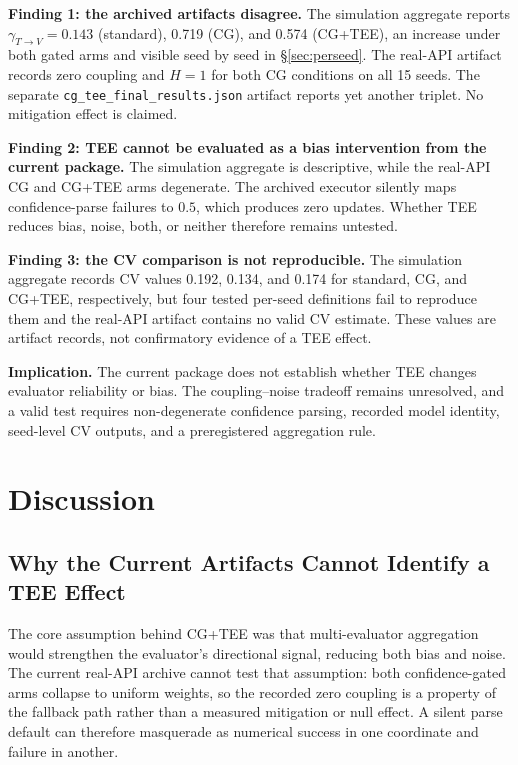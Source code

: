 \documentclass[11pt]{article}
\begin{document}
\textbf{Finding 1: the archived artifacts disagree.} The simulation aggregate reports $\gamma_{T\to V}=0.143$ (standard), 0.719 (CG), and 0.574 (CG+TEE), an increase under both gated arms and visible seed by seed in \S\ref{sec:perseed}. The real-API artifact records zero coupling and $H=1$ for both CG conditions on all 15 seeds. The separate \texttt{cg\_tee\_final\_results.json} artifact reports yet another triplet. No mitigation effect is claimed.

\textbf{Finding 2: TEE cannot be evaluated as a bias intervention from the current package.} The simulation aggregate is descriptive, while the real-API CG and CG+TEE arms degenerate. The archived executor silently maps confidence-parse failures to $0.5$, which produces zero updates. Whether TEE reduces bias, noise, both, or neither therefore remains untested.

\textbf{Finding 3: the CV comparison is not reproducible.} The simulation aggregate records CV values 0.192, 0.134, and 0.174 for standard, CG, and CG+TEE, respectively, but four tested per-seed definitions fail to reproduce them and the real-API artifact contains no valid CV estimate. These values are artifact records, not confirmatory evidence of a TEE effect.

\textbf{Implication.} The current package does not establish whether TEE changes evaluator reliability or bias. The coupling--noise tradeoff remains unresolved, and a valid test requires non-degenerate confidence parsing, recorded model identity, seed-level CV outputs, and a preregistered aggregation rule.

\section{Discussion}

\subsection{Why the Current Artifacts Cannot Identify a TEE Effect}

The core assumption behind CG+TEE was that multi-evaluator aggregation would strengthen the evaluator's directional signal, reducing both bias and noise. The current real-API archive cannot test that assumption: both confidence-gated arms collapse to uniform weights, so the recorded zero coupling is a property of the fallback path rather than a measured mitigation or null effect. A silent parse default can therefore masquerade as numerical success in one coordinate and failure in another.
\end{document}
